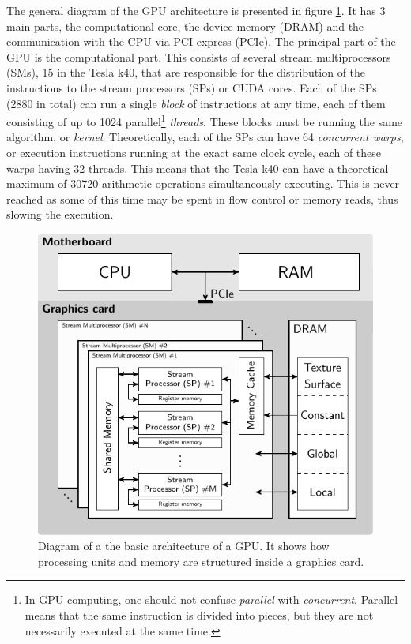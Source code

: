 The general diagram of the GPU architecture is presented in figure \ref{fig:GPUarch}. It has 3 main parts, the computational core, the device memory (DRAM) and the communication with the CPU via PCI express (PCIe).
The principal part of the GPU is the computational part. This consists of several stream multiprocessors (SMs), 15 in the Tesla k40, that are responsible for the distribution of the instructions to the stream processors (SPs) or CUDA cores. Each of the SPs (2880 in total) can run a single \textit{block} of instructions at any time, each of them consisting of up to 1024 parallel\footnote{In GPU computing, one should not confuse \textit{parallel} with \textit{concurrent}. Parallel means that the same instruction is divided into pieces, but they are not necessarily executed at the same time.} \textit{threads}. These blocks must be running the same algorithm, or \textit{kernel}. Theoretically, each of the SPs can have 64 \textit{concurrent warps}, or execution instructions running at the exact same clock cycle, each of these warps having 32 threads. This means that the Tesla k40 can have a theoretical maximum of 30720 arithmetic operations simultaneously executing. This is never reached as some of this time may be spent in flow control or memory reads, thus slowing the execution. 

\begin{figure}
\begin{center}

\includegraphics[width=\textwidth]{GPUmethods/architecture-figure0.pdf} 
\end{center}

\caption[Block diagram of a GPU architecture]{\label{fig:GPUarch} Diagram of a the basic architecture of a GPU. It shows how processing units and memory are structured inside a graphics card.} 
\end{figure}

